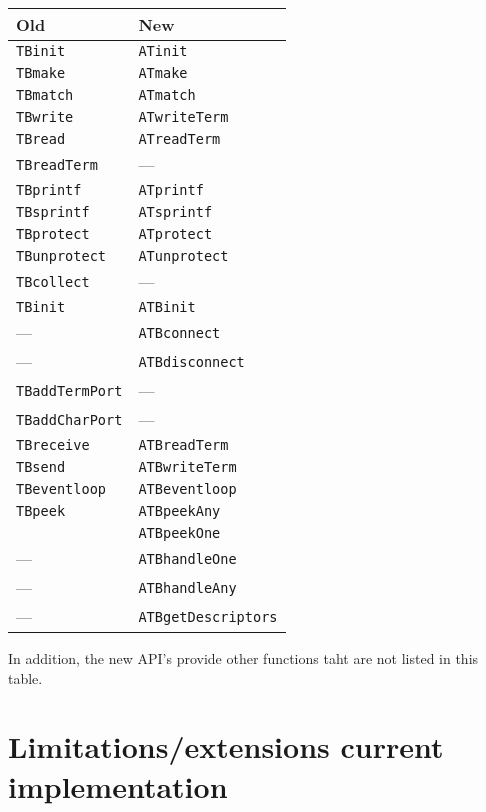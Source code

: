 \documentclass[twoside]{article} %
\begin{document}
\begin{center}
\begin{tabular}{|l|l|} \hline
Old                & New \\ \hline \hline

{\tt TBinit}       & {\tt ATinit}\\
{\tt TBmake}       & {\tt ATmake}\\
{\tt TBmatch}      & {\tt ATmatch}\\
{\tt TBwrite}      & {\tt ATwriteTerm}\\
{\tt TBread}       & {\tt ATreadTerm}\\
{\tt TBreadTerm}   & ---\\
{\tt TBprintf}     & {\tt ATprintf}\\
{\tt TBsprintf}    & {\tt ATsprintf}\\
{\tt TBprotect}    & {\tt ATprotect}\\
{\tt TBunprotect}  & {\tt ATunprotect}\\
{\tt TBcollect}    & ---\\ \hline

{\tt TBinit}       & {\tt ATBinit}\\
---                & {\tt ATBconnect}\\
---                & {\tt ATBdisconnect}\\

{\tt TBaddTermPort}& ---\\
{\tt TBaddCharPort}& ---\\
{\tt TBreceive}    & {\tt ATBreadTerm}\\
{\tt TBsend}       & {\tt ATBwriteTerm}\\
{\tt TBeventloop}  & {\tt ATBeventloop}\\
{\tt TBpeek}       & {\tt ATBpeekAny}\\
                   & {\tt ATBpeekOne}\\
---                & {\tt ATBhandleOne}\\
---                & {\tt ATBhandleAny}\\
---                & {\tt ATBgetDescriptors}\\ \hline
\end{tabular}
\end{center}

In addition, the new API's provide other functions taht are not listed in this
table.

\section{Limitations/extensions current implementation}
\end{document}
